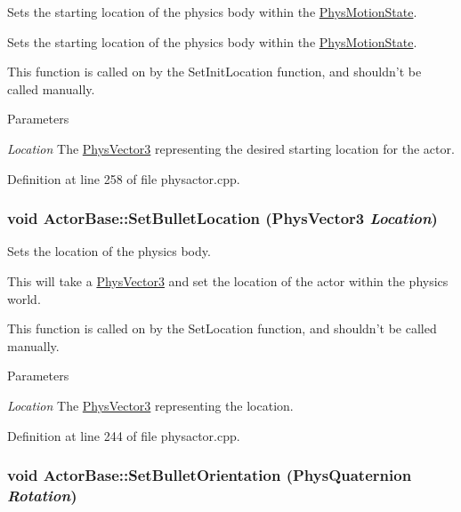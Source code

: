 Sets the starting location of the physics body within the \hyperlink{classPhysMotionState}{PhysMotionState}. 

Sets the starting location of the physics body within the \hyperlink{classPhysMotionState}{PhysMotionState}. \par
 This function is called on by the SetInitLocation function, and shouldn't be called manually. 
\begin{DoxyParams}{Parameters}
\item[{\em Location}]The \hyperlink{classPhysVector3}{PhysVector3} representing the desired starting location for the actor. \end{DoxyParams}


Definition at line 258 of file physactor.cpp.

\hypertarget{classActorBase_af64a57138bbd32c52581a5c8d0d29a76}{
\subsubsection[{SetBulletLocation}]{\setlength{\rightskip}{0pt plus 5cm}void ActorBase::SetBulletLocation ({\bf PhysVector3} {\em Location})}}
\label{dd/d7b/classActorBase_af64a57138bbd32c52581a5c8d0d29a76}


Sets the location of the physics body. 

This will take a \hyperlink{classPhysVector3}{PhysVector3} and set the location of the actor within the physics world. \par
 This function is called on by the SetLocation function, and shouldn't be called manually. 
\begin{DoxyParams}{Parameters}
\item[{\em Location}]The \hyperlink{classPhysVector3}{PhysVector3} representing the location. \end{DoxyParams}


Definition at line 244 of file physactor.cpp.

\hypertarget{classActorBase_adf817bd5a7c562f31f6724a06a3a0f79}{
\subsubsection[{SetBulletOrientation}]{\setlength{\rightskip}{0pt plus 5cm}void ActorBase::SetBulletOrientation ({\bf PhysQuaternion} {\em Rotation})}}
\label{dd/d7b/classActorBase_adf817bd5a7c562f31f6724a06a3a0f79}


